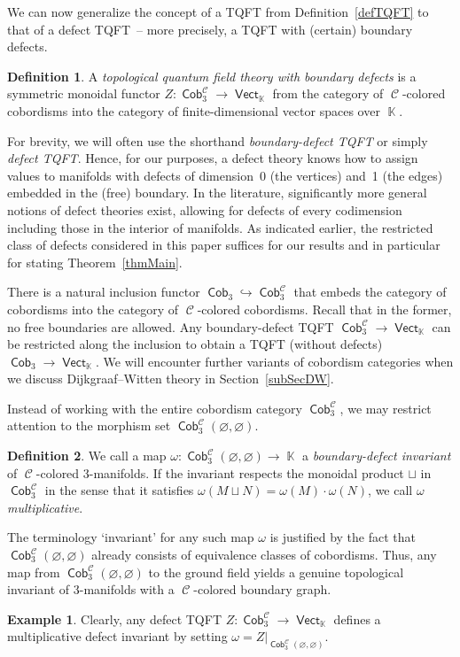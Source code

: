 \documentclass[10pt,a4paper]{amsart}
\DeclareMathOperator{\vect}{\mathsf{Vect}}
\DeclareMathOperator{\K}{\mathbb{K}}
\DeclareMathOperator{\Cob}{\mathsf{Cob}}
\DeclareMathOperator{\calc}{\mathcal{C}}
\numberwithin{equation}{section}
\theoremstyle{definition}
\newtheorem{Definition}[Definition]{Definition}
\newtheorem{Example}[Example]{Example}
\begin{document}
We can now generalize the concept of a TQFT from Definition~\ref{defTQFT} to that of a defect TQFT~-- more precisely, a TQFT with (certain) boundary defects.
\begin{Definition}\label{defTQFTDef}
 A \textit{topological quantum field theory with boundary defects} is a symmetric monoidal functor $Z\colon \Cob_3^{\calc} \rightarrow \vect_{\K}$ from the category of $\calc$-colored cobordisms into the category of finite-dimensional vector spaces over $\K$.
\end{Definition}
For brevity, we will often use the shorthand \textit{boundary-defect TQFT} or simply \textit{defect TQFT}.
Hence, for our purposes, a defect theory knows how to assign values to manifolds with defects of dimension~0 (the vertices) and~1 (the edges) embedded in the (free) boundary. In the literature, significantly more general notions of defect theories exist, allowing for defects of every codimension including those in the interior of manifolds. As indicated earlier, the restricted class of defects considered in this paper suffices for our results and in particular for stating Theorem~\ref{thmMain}.

There is a natural inclusion functor $\Cob_3 \hookrightarrow \Cob_3^{\calc}$ that embeds the category of cobordisms into the category of $\calc$-colored cobordisms. Recall that in the former, no free boundaries are allowed. Any boundary-defect TQFT $\Cob_3^{\calc} \rightarrow \vect_{\K}$ can be restricted along the inclusion to obtain a TQFT (without defects) $\Cob_3 \rightarrow \vect_{\K}$.
We will encounter further variants of cobordism categories when we discuss Dijkgraaf--Witten theory in Section~\ref{subSecDW}.

Instead of working with the entire cobordism category $\Cob_3^{\calc}$, we may restrict attention to the morphism set $\Cob_3^{\calc}(\varnothing, \varnothing)$.

\begin{Definition}\label{defInv}
 We call a map $\omega\colon \Cob_3^{\calc}(\varnothing, \varnothing) \rightarrow \K$ a \textit{boundary-defect invariant} of $\calc$-colored 3-manifolds. If the invariant respects the monoidal product $\sqcup$ in $\Cob_3^{\calc}$ in the sense that it satisfies $\omega(M \sqcup N) = \omega(M) \cdot \omega(N)$, we call $\omega$ \textit{multiplicative}.
\end{Definition}
The terminology `invariant' for any such map $\omega$ is justified by the fact that $\Cob_3^{\calc}(\varnothing, \varnothing)$ already consists of equivalence classes of cobordisms. Thus, any map from $\Cob_3^{\calc}(\varnothing, \varnothing)$ to the ground field yields a genuine topological invariant of 3-manifolds with a $\calc$-colored boundary graph.
\begin{Example}
 Clearly, any defect TQFT $Z\colon \Cob_3^{\calc} \rightarrow \vect_{\K}$ defines a multiplicative defect invariant by setting $\omega = Z|_{\Cob_3^{\calc}(\varnothing, \varnothing)}$.
\end{Example}
\end{document}
